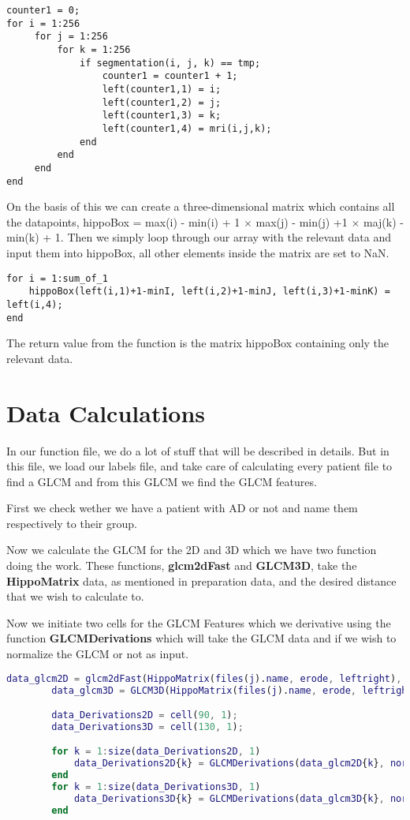\begin{lstlisting}
counter1 = 0;
for i = 1:256
     for j = 1:256
         for k = 1:256
             if segmentation(i, j, k) == tmp;
                 counter1 = counter1 + 1;
                 left(counter1,1) = i;
                 left(counter1,2) = j;
                 left(counter1,3) = k;
                 left(counter1,4) = mri(i,j,k);
             end
         end
     end
end
\end{lstlisting}

On the basis of this we can create a three-dimensional matrix which contains all the datapoints, hippoBox = max(i) - min(i) + 1 $\times$ max(j) - min(j) +1 $\times$ maj(k) - min(k) + 1.
Then we simply loop through our array with the relevant data and input them into hippoBox, all other elements inside the matrix are set to NaN.

\begin{lstlisting}
for i = 1:sum_of_1
    hippoBox(left(i,1)+1-minI, left(i,2)+1-minJ, left(i,3)+1-minK) = left(i,4);
end
\end{lstlisting}

The return value from the function is the matrix hippoBox containing only the relevant data.

\section{Data Calculations}

In our function file, we do a lot of stuff that will be described in details. But in this file, we load our labels file, and take care of calculating every patient file to find a GLCM and from this GLCM we find the GLCM features.

First we check wether we have a patient with AD or not and name them respectively to their group.

Now we calculate the GLCM for the 2D and 3D which we have two function doing the work. These functions, \textbf{glcm2dFast} and \textbf{GLCM3D}, take the \textbf{HippoMatrix} data, as mentioned in preparation data, and the desired distance that we wish to calculate to.

Now we initiate two cells for the GLCM Features which we derivative using the function \textbf{GLCMDerivations} which will take the GLCM data and if we wish to normalize the GLCM or not as input.

\begin{lstlisting}[language=Matlab]
        data_glcm2D = glcm2dFast(HippoMatrix(files(j).name, erode, leftright), 10);
        data_glcm3D = GLCM3D(HippoMatrix(files(j).name, erode, leftright),10);

        data_Derivations2D = cell(90, 1);
        data_Derivations3D = cell(130, 1);

        for k = 1:size(data_Derivations2D, 1)
            data_Derivations2D{k} = GLCMDerivations(data_glcm2D{k}, norm);
        end
        for k = 1:size(data_Derivations3D, 1)
            data_Derivations3D{k} = GLCMDerivations(data_glcm3D{k}, norm);
        end
\end{lstlisting}

